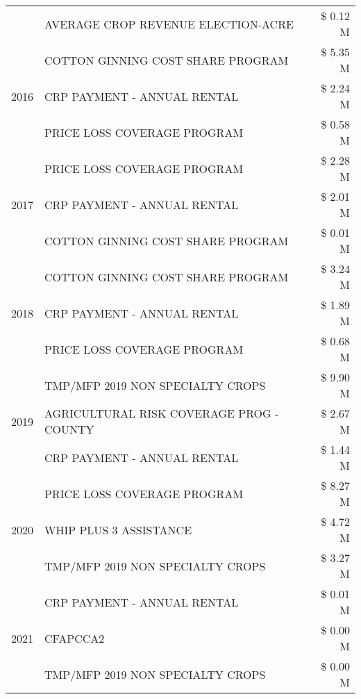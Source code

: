 \begin{tabular}{llr}
 & AVERAGE CROP REVENUE ELECTION-ACRE & \$ 0.12 M \\
\cline{1-3}
\multirow[t]{3}{*}{2016} & COTTON GINNING COST SHARE PROGRAM & \$ 5.35 M \\
 & CRP PAYMENT - ANNUAL RENTAL & \$ 2.24 M \\
 & PRICE LOSS COVERAGE PROGRAM & \$ 0.58 M \\
\cline{1-3}
\multirow[t]{3}{*}{2017} & PRICE LOSS COVERAGE PROGRAM & \$ 2.28 M \\
 & CRP PAYMENT - ANNUAL RENTAL & \$ 2.01 M \\
 & COTTON GINNING COST SHARE PROGRAM & \$ 0.01 M \\
\cline{1-3}
\multirow[t]{3}{*}{2018} & COTTON GINNING COST SHARE PROGRAM & \$ 3.24 M \\
 & CRP PAYMENT - ANNUAL RENTAL & \$ 1.89 M \\
 & PRICE LOSS COVERAGE PROGRAM & \$ 0.68 M \\
\cline{1-3}
\multirow[t]{3}{*}{2019} & TMP/MFP 2019 NON SPECIALTY CROPS & \$ 9.90 M \\
 & AGRICULTURAL RISK COVERAGE PROG - COUNTY & \$ 2.67 M \\
 & CRP PAYMENT - ANNUAL RENTAL & \$ 1.44 M \\
\cline{1-3}
\multirow[t]{3}{*}{2020} & PRICE LOSS COVERAGE PROGRAM & \$ 8.27 M \\
 & WHIP PLUS 3 ASSISTANCE & \$ 4.72 M \\
 & TMP/MFP 2019 NON SPECIALTY CROPS & \$ 3.27 M \\
\cline{1-3}
\multirow[t]{3}{*}{2021} & CRP PAYMENT - ANNUAL RENTAL & \$ 0.01 M \\
 & CFAPCCA2 & \$ 0.00 M \\
 & TMP/MFP 2019 NON SPECIALTY CROPS & \$ 0.00 M \\
\cline{1-3}
\bottomrule
\end{tabular}
